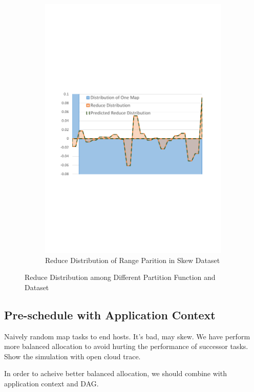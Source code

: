 \documentclass[10pt,twocolumn]{article}
\begin{document}
\begin{figure}
\begin{subfigure}[b]{0.32\linewidth}
		\includegraphics[width=\linewidth]{fig/range_pre}
		\caption{Reduce Distribution of Range Parition in Skew Dataset}
		\label{fig:range_pre}
	\end{subfigure}
	\caption{Reduce Distribution among Different Partition Function and Dataset}
	\label{fig:dis}
\end{figure}
\subsection{Pre-schedule with Application Context}
Naively random map tasks to end hosts. It's bad, may skew. We have perform more balanced allocation to avoid hurting the performance of successor tasks.
Show the simulation with open cloud trace. 

In order to acheive better balanced allocation, we should combine with application context and DAG.
\end{document}
